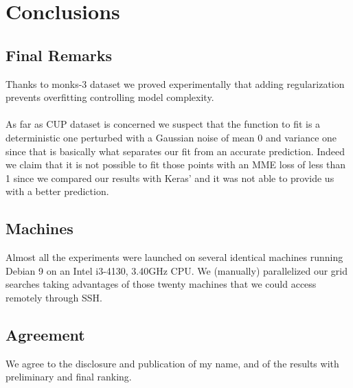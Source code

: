 \section{Conclusions}

\subsection{Final Remarks}
Thanks to monks-3 dataset we proved experimentally that adding regularization prevents overfitting controlling model complexity.

\paragraph{}
As far as CUP dataset is concerned we suspect that the function to fit is a deterministic one perturbed with a Gaussian noise of mean 0 and variance one since that is basically what separates our fit from an accurate prediction. Indeed we claim that it is not possible to fit those points with an MME loss of less than 1 since we compared our results with Keras' and it was not able to provide us with a better prediction.

\subsection{Machines}
Almost all the experiments were launched on several identical machines running Debian 9 on an Intel i3-4130, 3.40GHz CPU. We (manually) parallelized our grid searches taking advantages of those twenty machines that we could access remotely through SSH.
 
\subsection{Agreement}
We agree to the disclosure and publication of my name, and of the results with preliminary and final ranking.


